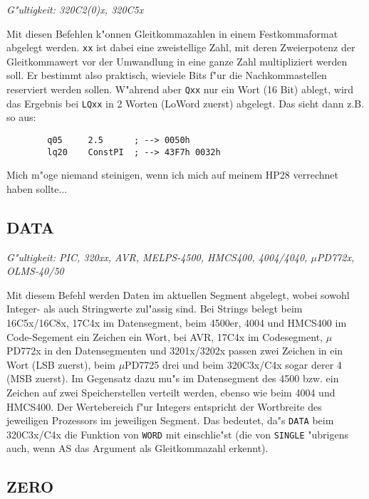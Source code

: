 \documentclass[12pt,a4paper,twoside]{report}
\makeatletter
\newcommand{\tty}[1]{{\tt #1}}
\newcommand{\ttindex}[1]{\index{#1@{\tt #1}}}
\makeatother
\begin{document}
{{\em G"ultigkeit: 320C2(0)x, 320C5x}

Mit diesen Befehlen k"onnen Gleitkommazahlen in einem Festkommaformat
abgelegt werden.  \tty{xx} ist dabei eine zweistellige Zahl, mit deren
Zweierpotenz der Gleitkommawert vor der Umwandlung in eine ganze Zahl
multipliziert werden soll.  Er bestimmt also praktisch, wieviele Bits
f"ur die Nachkommastellen reserviert werden sollen.  W"ahrend aber
\tty{Qxx} nur ein Wort (16 Bit) ablegt, wird das Ergebnis bei \tty{LQxx}
in 2 Worten (LoWord zuerst) abgelegt.  Das sieht dann z.B. so
aus:
\begin{verbatim}
        q05     2.5      ; --> 0050h
        lq20    ConstPI  ; --> 43F7h 0032h
\end{verbatim}
Mich m"oge niemand steinigen, wenn ich mich auf meinem HP28
verrechnet haben sollte...


\subsection{DATA}
\ttindex{DATA}

{\em G"ultigkeit: PIC, 320xx, AVR, MELPS-4500, HMCS400, 4004/4040,
 $\mu$PD772x, OLMS-40/50}

Mit diesem Befehl werden Daten im aktuellen Segment abgelegt,
wobei sowohl Integer- als auch Stringwerte zul"assig sind.  Bei
Strings belegt beim 16C5x/16C8x, 17C4x im Datensegment, beim
4500er, 4004 und HMCS400 im Code-Segement ein Zeichen ein Wort,
bei AVR, 17C4x im Codesegment, $\mu$PD772x in den Datensegmenten
und 3201x/3202x passen zwei Zeichen in ein Wort (LSB zuerst),
beim $\mu$PD7725 drei und beim 320C3x/C4x sogar derer 4 (MSB
zuerst).  Im Gegensatz dazu mu"s im Datensegment des 4500 bzw. 
ein Zeichen auf zwei Speicherstellen verteilt werden, ebenso wie
beim 4004 und HMCS400.  Der Wertebereich f"ur Integers entspricht
der Wortbreite des jeweiligen Prozessors im jeweiligen Segment. 
Das bedeutet, da"s \tty{DATA} beim 320C3x/C4x die Funktion von
\tty{WORD} mit einschlie"st (die von \tty{SINGLE} "ubrigens auch,
wenn AS das Argument als Gleitkommazahl erkennt).


\subsection{ZERO}
\ttindex{ZERO}

}
\end{document}
